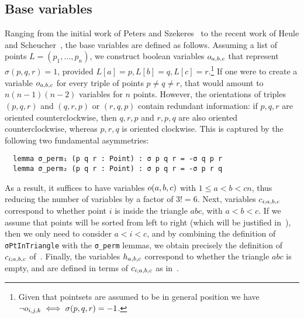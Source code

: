 \subsection{Base variables}
Ranging from the initial work of Peters and Szekeres~\cite{szekeres_peters_2006} to the recent work of Heule and Scheucher~\cite{emptyHexagonNumber}, the base variables are defined as follows. Assuming a list of points $L = (p_1, \ldots, p_n)$,
we construct boolean variables $\orvar_{a, b, c}$ that represent $\sigma(p, q, r) = 1$, provided $L[a] = p, L[b] = q, L[c] =r$.\footnote{Given that pointsets are assumed to be in general position we have $\neg \orvar_{i,j,k} \iff \sigma(p, q, r) = -1$.} If one were to create a variable $\orvar_{a,b,c}$ for every triple of points $p \neq q \neq r$, that would amount to $n(n-1)(n-2)$ variables for $n$ points. However, the orientations of triples $(p, q, r)$ and $(q, r, p)$ or $(r, q, p)$ contain redundant information: if $p,q,r$ are oriented counterclockwise, then $q,r,p$ and $r,p,q$ are also oriented counterclockwise, whereas $p,r,q$ is oriented clockwise. This is captured by the following two fundamental asymmetries:
\begin{lstlisting}
  lemma σ_perm₁ (p q r : Point) : σ p q r = -σ q p r
  lemma σ_perm₂ (p q r : Point) : σ p q r = -σ p r q
\end{lstlisting}
As a result, it suffices to have variables $\orvar(a, b, c)$ with $1 \leq a < b < c n$, thus reducing the number of variables by a factor of $3! = 6$.
Next, variables $\cvar_{i;a,b,c}$ correspond to whether point $i$ is inside the triangle $abc$, with $a < b < c$.
If we assume that points will be sorted from left to right (which will be justified in~), then we only need to consider $a < i < c$,
and by combining the definition of \lstinline|σPtInTriangle| with the \lstinline|σ_perm| lemmas, we obtain precisely the definition of $\cvar_{i;a,b,c}$ of~.
Finally, the variables $\hvar_{a, b, c}$ correspond to whether the triangle $abc$ is empty, and are defined in terms of $\cvar_{i;a,b,c}$ as in~.






